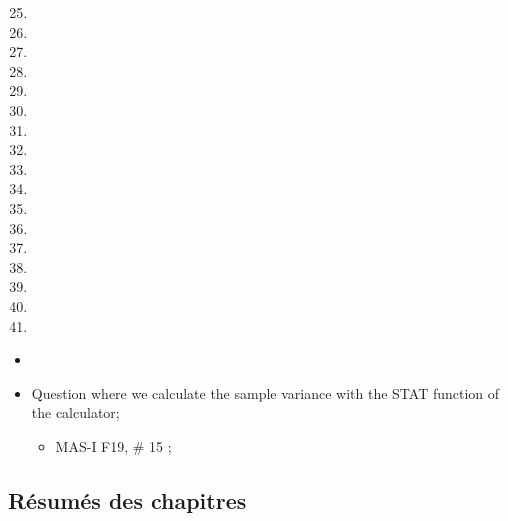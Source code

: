 \begin{ASM_chapter}
\begin{enumerate}
  \setcounter{enumi}{24}
	\item	{}
	\item	{}
	\item	{}
	\item	{}
	\item	{}
	\item	{}
	\item	{}
	\item	{}
	\item	{}
	\item	{}
	\item	{}
	\item	{}
	\item	{}
	\item	{}
	\item	{}
	\item	{}
	\item	{}
\end{enumerate}
\end{ASM_chapter}

\begin{YTB_vids}
\begin{itemize}
	\item	
\end{itemize}
\end{YTB_vids}

\begin{distributions}
\begin{itemize}
	\item	Question where we calculate the sample variance with the STAT function of the calculator;
		\begin{itemize}
		\item	MAS-I F19, \# 15	;
		\end{itemize}
\end{itemize}
\end{distributions}

\subsection{Résumés des chapitres}

